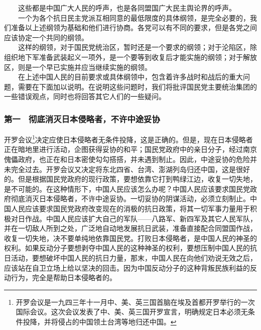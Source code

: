 \documentclass[cn,11pt,chinese]{elegantbook}
\def\myformat#1{\hfil\hfil #1}
\begin{document}
　　这些都是中国广大人民的呼声，也是各同盟国广大民主舆论界的呼声。\\
　　一个为各个抗日民主党派互相同意的最低限度的具体纲领，是完全必要的，我们准备以上述纲领为基础和他们进行协商。各党可以有不同的要求，但是各党之间应该协定一个共同的纲领。\\
　　这样的纲领，对于国民党统治区，暂时还是一个要求的纲领；对于沦陷区，除组织地下军准备武装起义一项外，是一个要等到收复后才能实施的纲领；对于解放区，则是一个早已实施并应当继续实施的纲领。\\
　　在上述中国人民的目前要求或具体纲领中，包含着许多战时和战后的重大问题，需要在下面加以说明。在说明这些问题时，我们将批评国民党主要统治集团的一些错误观点，同时也将回答其它人们的一些疑问。\\
\subsubsection*{\myformat{第一　彻底消灭日本侵略者，不许中途妥协}}
开罗会议\footnote[15]{ 开罗会议是一九四三年十一月中、美、英三国首脑在埃及首都开罗举行的一次国际会议。这次会议发表了中、美、英三国开罗宣言，明确规定日本必须无条件投降，并将侵占的中国领土台湾等地归还中国。}决定应使日本侵略者无条件投降，这是正确的。但是，现在日本侵略者正在暗地里进行活动，企图获得妥协的和平；国民党政府中的亲日分子，经过南京傀儡政府，也正在和日本密使勾勾搭搭，并未遇到制止。因此，中途妥协的危险并未完全过去。开罗会议又决定将东北四省、台湾、澎湖列岛归还中国，这是很好的。但是根据国民党政府的现行政策，要想依靠它打到鸭绿江边，收复一切失地，是不可能的。在这种情形下，中国人民应该怎么办呢？中国人民应该要求国民党政府彻底消灭日本侵略者，不许中途妥协。一切妥协的阴谋活动，必须立刻制止。中国人民应该要求国民党政府改变现在的消极的抗日政策，将其一切军事力量用于积极对日作战。中国人民应该扩大自己的军队——八路军、新四军及其它人民军队，并在一切敌人所到之处，广泛地自动地发展抗日武装，准备直接配合同盟国作战，收复一切失地，决不要单纯地依靠国民党。打败日本侵略者，是中国人民的神圣的权利。如果反动分子要想剥夺中国人民的这种神圣的权利，要想压制中国人民的抗日活动，要想破坏中国人民的抗日力量，那末，中国人民在向他们劝说无效之后，应该站在自卫立场上给以坚决的回击。因为中国反动分子的这种背叛民族利益的反动行为，完全是帮助日本侵略者的。\\
\end{document}
